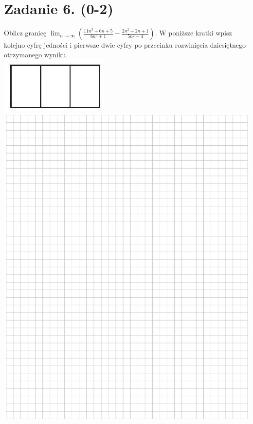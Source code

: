 \documentclass[10pt]{article}
\begin{document}
\section*{Zadanie 6. (0-2)}
Oblicz granicę \(\lim _{n \rightarrow \infty}\left(\frac{11 n^{3}+6 n+5}{6 n^{3}+1}-\frac{2 n^{2}+2 n+1}{5 n^{2}-4}\right)\). W poniższe kratki wpisz kolejno cyfrę jedności i pierwsze dwie cyfry po przecinku rozwinięcia dziesiętnego otrzymanego wyniku.\\
\includegraphics[max width=\textwidth, center]{2024_11_21_838c0cfd77f195c20440g-04}\\
\includegraphics[max width=\textwidth, center]{2024_11_21_838c0cfd77f195c20440g-04(1)}
\end{document}
